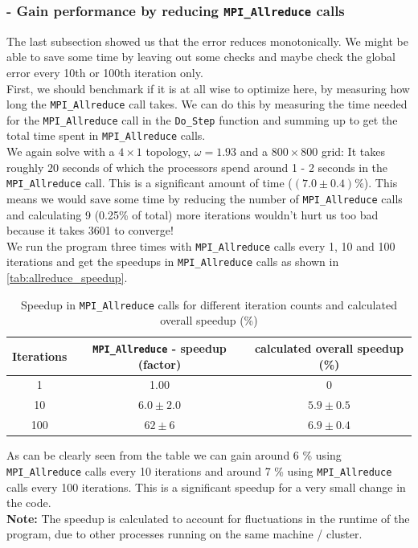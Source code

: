\subsubsection{ - Gain performance by reducing \texttt{MPI\_Allreduce} calls}
The last subsection showed us that the error reduces monotonically. We might be able to save some time by leaving out some checks and maybe check the global error every 10th or 100th iteration only.\\ First, we should benchmark if it is at all wise to optimize here, by measuring how long the \texttt{MPI\_Allreduce} call takes. We can do this by measuring the time needed for the \texttt{MPI\_Allreduce} call in the \texttt{Do\_Step} function and summing up to get the total time spent in \texttt{MPI\_Allreduce} calls.\\
We again solve with a $4 \times 1$ topology, $\omega = 1.93$ and a $800 \times 800$ grid: It takes roughly $20$ seconds of which the processors spend around 1 - 2 seconds in the \texttt{MPI\_Allreduce} call. This is a significant amount of time ($(7.0 \pm 0.4)$\%). This means we would save some time by reducing the number of \texttt{MPI\_Allreduce} calls and calculating 9 (0.25\% of total) more iterations wouldn't hurt us too bad because it takes 3601 to converge!\\
We run the program three times with \texttt{MPI\_Allreduce} calls every 1, 10 and 100 iterations and get the speedups in \texttt{MPI\_Allreduce} calls as shown in \autoref{tab:allreduce_speedup}.
\begin{table}[H]
    \centering
    \begin{tabular}{|c|c|c|}
        \hline
        Iterations & \texttt{MPI\_Allreduce} - speedup (factor) & calculated overall speedup (\%)\\\hline
        1  & 1.00 & 0\\\hline
        10 & $6.0 \pm 2.0$ & $ 5.9 \pm 0.5$\\\hline
        100& $62 \pm 6$    & $ 6.9 \pm 0.4$\\\hline
    \end{tabular}
    \caption{Speedup in \texttt{MPI\_Allreduce} calls for different iteration counts and calculated overall speedup (\%)}
    \label{tab:allreduce_speedup}
\end{table}
As can be clearly seen from the table we can gain around 6 \% using \texttt{MPI\_Allreduce} calls every 10 iterations and around 7 \% using \texttt{MPI\_Allreduce} calls every 100 iterations. This is a significant speedup for a very small change in the code.\\
\textbf{Note:} The speedup is calculated to account for fluctuations in the runtime of the program, due to other processes running on the same machine / cluster. 

